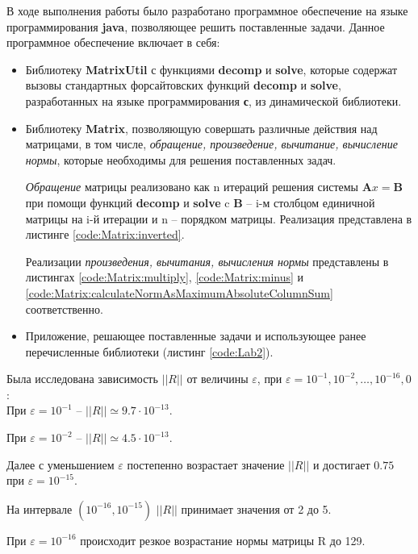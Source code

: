 В ходе выполнения работы было разработано программное обеспечение на языке программирования \textbf{java}, позволяющее решить поставленные задачи. Данное программное обеспечение включает в себя:
\begin{itemize}

\item Библиотеку \textbf{MatrixUtil} с функциями \textbf{decomp} и \textbf{solve}, которые содержат вызовы стандартных форсайтовских функций \textbf{decomp} и \textbf{solve}, разработанных на языке программирования \textbf{с}, из динамической библиотеки.

\item Библиотеку \textbf{Matrix}, позволяющую совершать различные действия над матрицами, в том числе, \textit{обращение, произведение, вычитание, вычисление нормы}, которые необходимы для решения поставленных задач.

 \textit{Обращение} матрицы реализовано как n итераций решения системы $\textbf{A}x = \textbf{B}$ при помощи функций \textbf{decomp} и \textbf{solve} c $\textbf{B}$ -- i-м столбцом единичной матрицы на i-й итерации и n -- порядком матрицы. Реализация представлена в листинге \ref{code:Matrix:inverted}.
 
 Реализации \textit{произведения, вычитания, вычисления нормы} представлены в листингах \ref{code:Matrix:multiply}, \ref{code:Matrix:minus} и \ref{code:Matrix:calculateNormAsMaximumAbsoluteColumnSum} соответственно.

\item Приложение, решающее поставленные задачи и использующее ранее перечисленные библиотеки (листинг \ref{code:Lab2}).

\end{itemize} 

Была исследована зависимость $||R||$ от величины $\varepsilon$, при $\varepsilon = 10^{-1}, 10^{-2}, \dots, 10^{-16}, 0$:\\[3mm]

При $\varepsilon = 10^{-1}$ -- $||R|| \simeq 9.7 \cdot 10^{-13}$.

При $\varepsilon = 10^{-2}$ -- $||R|| \simeq 4.5 \cdot 10^{-13}$.

Далее с уменьшением $\varepsilon$ постепенно возрастает значение $||R||$ и достигает $0.75$ при $\varepsilon = 10^{-15}$.

На интервале $(10^{-16}, 10^{-15})$ $||R||$ принимает значения от 2 до 5.

При $\varepsilon = 10^{-16}$ происходит резкое возрастание нормы матрицы R до 129.

